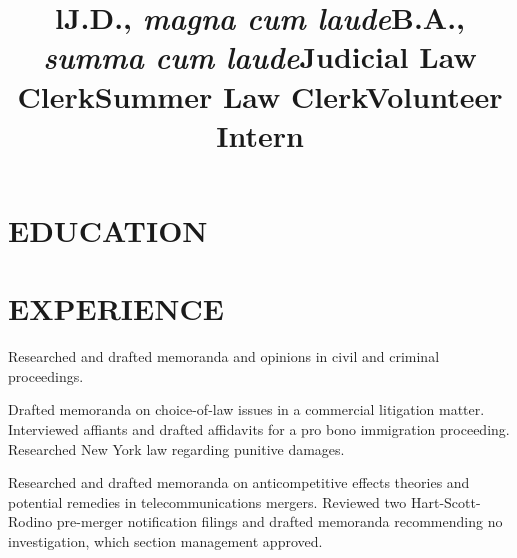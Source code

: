 \documentclass{res}
\title{l}\dates{r}\\
\begin{document}

\address{445 E. 14th St. \#12C\\New York, NY 10009}
\address{dherts@jd19.law.harvard.edu \\ (216) 288-2768}

\begin{resume}

\section{EDUCATION}
        \title{J.D., \textit{magna cum laude}}
        \begin{position}
        \end{position}

        \title{B.A., \textit{summa cum laude}}
        \begin{position}
        \end{position}

\section{EXPERIENCE}
	
	\title{Judicial Law Clerk}
	\begin{position}
		Researched and drafted memoranda and opinions in civil and criminal proceedings.
	\end{position}

   	\title{Summer Law Clerk}
	\begin{position}
		Drafted memoranda on choice-of-law issues in a commercial litigation matter. Interviewed affiants and drafted affidavits for a pro bono immigration proceeding. Researched New York law regarding punitive damages.
	\end{position}

	\title{Volunteer Intern}
	\begin{position}
        	Researched and drafted memoranda on anticompetitive effects theories and potential remedies in telecommunications mergers. Reviewed two Hart-Scott-Rodino pre-merger notification filings and drafted memoranda recommending no investigation, which section management approved.
    \end{position}


\end{resume}
\end{document}
